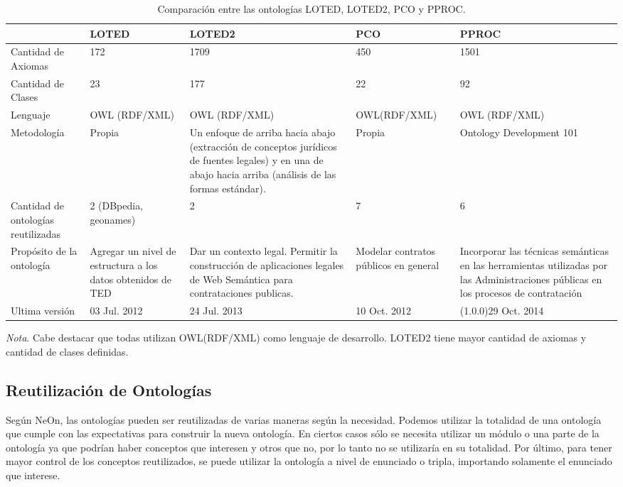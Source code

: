\begin{table}[!htpb]
    \caption{Comparación entre las ontologías LOTED, LOTED2, PCO y PPROC.}
    \label{tab:comparacion_ontologias}
    
    \scriptsize 
    \begin{tabular}{|L{2cm}|C{3cm}|C{3cm}|C{2.5cm}|C{3cm}|}
    \hline
     & LOTED & LOTED2 & PCO & PPROC \\
    \hline

    
    Cantidad de Axiomas & 172 & 1709 & 450 & 1501 \\
    \hline

    Cantidad de Clases & 23 & 177 & 22 & 92\\
    \hline

    Lenguaje & OWL (RDF/XML) & OWL (RDF/XML) & OWL(RDF/XML) & OWL (RDF/XML)\\
    \hline
    Metodología & Propia & 
    Un enfoque de arriba hacia abajo (extracción de conceptos jurídicos de fuentes legales) y en una de abajo hacia arriba (análisis de las formas estándar).
     & Propia & Ontology Development 101\\
     \hline
    Cantidad de ontologías reutilizadas & 2 (DBpedia, geonames) & 2 & 7 & 6\\
    \hline
    Propósito de la ontología & Agregar un nivel de estructura a los datos obtenidos de TED & Dar un contexto legal. Permitir la construcción de aplicaciones legales de Web Semántica para contrataciones publicas. & Modelar contratos públicos en general & Incorporar las técnicas
    semánticas en las herramientas utilizadas por las Administraciones públicas en los procesos de contratación\\
    \hline
    Ultima versión & 03 Jul. 2012 & 24 Jul. 2013 & 10 Oct. 2012 & (1.0.0)29 Oct. 2014\\
    \hline
    \end{tabular}
    
    \bigskip
    \small\textit{Nota}. Cabe destacar que todas utilizan OWL(RDF/XML) como lenguaje de desarrollo. LOTED2 tiene mayor cantidad de axiomas y cantidad de clases definidas.
    \end{table}

    \subsection{Reutilización de Ontologías}


    Según NeOn, las ontologías pueden ser reutilizadas de varias maneras según la necesidad. 
Podemos utilizar la totalidad de una ontología que cumple con las expectativas para construir la nueva ontología. En ciertos casos sólo se necesita utilizar un módulo o una parte de la ontología ya que podrían haber conceptos que interesen y otros que no, por lo tanto no se utilizaría en su totalidad. Por último, para tener mayor control de los conceptos reutilizados, se puede utilizar la ontología a nivel de enunciado o tripla, importando solamente el enunciado que interese. 

